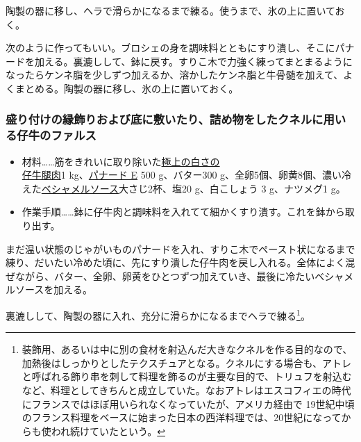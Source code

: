 \begin{recette}
陶製の器に移し、ヘラで滑らかになるまで練る。使うまで、氷の上に置いておく。

次のように作ってもいい。ブロシェの身を調味料とともにすり潰し、そこにパナードを加える。裏漉しして、鉢に戻す。すりこ木で力強く練ってまとまるようになったらケンネ脂を少しずつ加えるか、溶かしたケンネ脂と牛骨髄を加えて、よくまとめる。陶製の器に移し、氷の上に置いておく。

\hypertarget{farce-de-veau-pour-bordures}{%
\subsubsection{盛り付けの縁飾りおよび底に敷いたり、詰め物をしたクネルに用いる仔牛のファルス}\label{farce-de-veau-pour-bordures}}



\begin{itemize}
\item
  材料\ldots{}\ldots{}筋をきれいに取り除いた\ul{極上の白さの\\仔牛腿肉}1
  kg、\protect\hyperlink{panade-e}{パナード E} 500 g、バター300
  g、全卵5個、卵黄8個、濃い冷えた\protect\hyperlink{sauce-bechamel}{ベシャメルソース}大さじ2杯、塩20
  g、白こしょう 3 g、ナツメグ1 g。
\item
  作業手順\ldots{}\ldots{}鉢に仔牛肉と調味料を入れてて細かくすり潰す。これを鉢から取り出す。
\end{itemize}

まだ温い状態のじゃがいものパナードを入れ、すりこ木でペースト状になるまで練り、だいたい冷めた頃に、先にすり潰した仔牛肉を戻し入れる。全体によく混ぜながら、バター、全卵、卵黄をひとつずつ加えていき、最後に冷たいベシャメルソースを加える。

裏漉しして、陶製の器に入れ、充分に滑らかになるまでヘラで練る\footnote{装飾用、あるいは中に別の食材を射込んだ大きなクネルを作る目的なので、加熱後はしっかりとしたテクスチュアとなる。クネルにする場合も、アトレと呼ばれる飾り串を刺して料理を飾るのが主要な目的で、トリュフを射込むなど、料理としてきちんと成立していた。なおアトレはエスコフィエの時代にフランスではほぼ用いられなくなっていたが、アメリカ経由で
  19世紀中頃のフランス料理をベースに始まった日本の西洋料理では、20世紀になってからも使われ続けていたという。}。


\end{recette}
